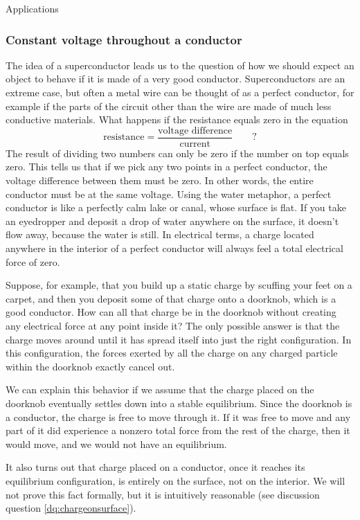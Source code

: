 \begin{envsubsection}{Applications}
\subsubsection{Constant voltage throughout a conductor}
The idea of a superconductor leads us to the question of how
we should expect an object to behave if it is made of a very
good conductor. Superconductors are an extreme case, but
often a metal wire can be thought of as a perfect conductor,
for example if the parts of the circuit other than the wire
are made of much less conductive materials. What happens if
the resistance equals zero in the equation 
\begin{equation*}
	\text{resistance} = \frac{\text{voltage difference}}{\text{current}} \qquad \text{?}
\end{equation*}
The result
of dividing two numbers can only be zero if the number on
top equals zero. This tells us that if we pick any two
points in a perfect conductor, the voltage difference
between them must be zero. In other words, the entire
conductor must be at the same voltage. Using the water
metaphor, a perfect conductor is like a perfectly calm
lake or canal, whose surface is flat. If you take an
eyedropper and deposit a drop of water anywhere on the
surface, it doesn't flow away, because the water is still.
In electrical terms, a charge located anywhere in the interior
of a perfect conductor will always feel a total electrical
force of zero.

Suppose, for example, that you build up
a static charge by scuffing your feet on a carpet, and then
you deposit some of that charge onto a doorknob, which is a
good conductor.  How can all that charge be in the doorknob
without creating any electrical force at any point inside
it? The only possible answer is that the charge moves around
until it has spread itself into just the right configuration.
In this configuration, the forces exerted by all the charge
on any charged particle within the doorknob
exactly cancel out.

We can explain this behavior if we assume that the charge
placed on the doorknob eventually settles down into a stable
equilibrium. Since the doorknob is a conductor, the charge
is free to move through it. If it was free to move and any
part of it did experience a nonzero total force from the
rest of the charge, then it would move, and we would not
have an equilibrium.

It also turns out that charge placed on a conductor, once it
reaches its equilibrium configuration, is entirely on the
surface, not on the interior. We will not prove this fact
formally, but it is intuitively reasonable (see
discussion question \ref{dq:chargeonsurface}).\label{text:chargeonsurface}


\end{envsubsection}
